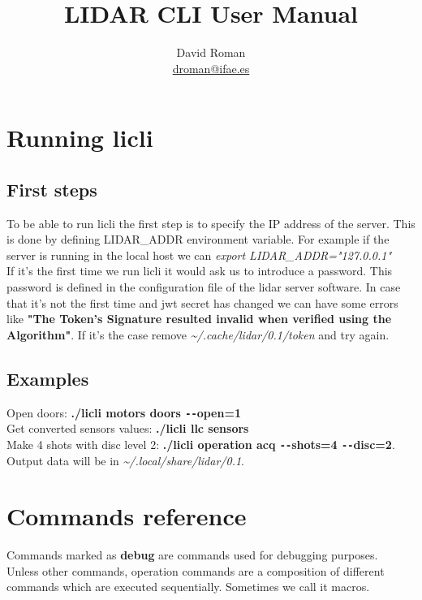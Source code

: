 \documentclass[letterpaper, 10 pt]{article}
\begin{document}
\title{LIDAR CLI User Manual}
\author{David Roman \\  \href{mailto:droman@ifae.es}{droman@ifae.es} }
\maketitle
\pagestyle{empty}
\newpage
\tableofcontents
\newpage
{}
\pagestyle{plain}

\section{Running licli}
\subsection{First steps}
To be able to run licli the first step is to specify the IP address of the server. This is done by defining LIDAR\_ADDR environment variable. For example if the server is running in the local host we can \emph{export LIDAR\_ADDR="127.0.0.1"}\\
\linebreak
If it's the first time we run licli it would ask us to introduce a password. This password is defined in the configuration file of the lidar server software. 
In case that it's not the first time and jwt secret has changed we can have some errors like \textbf{"The Token's Signature resulted invalid when verified using the Algorithm"}. If it's the case remove \textit{\~{}/.cache/lidar/0.1/token} and try again.\\

\subsection{Examples}

Open doors: \textbf{./licli motors doors \texttt{-{}-}open=1}\\
Get converted sensors values: \textbf{./licli llc sensors}\\
Make 4 shots with disc level 2: \textbf{./licli operation acq \texttt{-{}-}shots=4 \texttt{-{}-}disc=2}. Output data will be in \textit{\~{}/.local/share/lidar/0.1}.

\section{Commands reference}
Commands marked as \textbf{debug} are commands used for debugging purposes.\\
\linebreak
Unless other commands, operation commands are a composition of different commands which are executed sequentially. Sometimes we call it macros.
\end{document}
